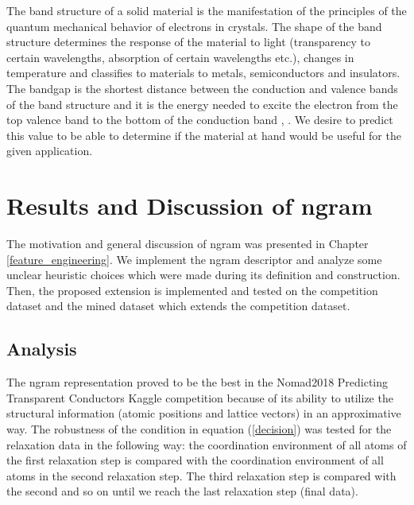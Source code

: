 \documentclass[11pt,oneside,czech,american]{book} %
\theoremstyle{plain}
\theoremstyle{definition}
\begin{document}
The band structure of a solid material is the manifestation of the principles of the quantum mechanical behavior of electrons in crystals. The shape of the band structure determines the response of the material to light (transparency to certain wavelengths, absorption of certain wavelengths etc.), changes in temperature and classifies to materials to metals, semiconductors and insulators. The bandgap is the shortest distance between the conduction and valence bands of the band structure and it is the energy needed to excite the electron from the top valence band to the bottom of the conduction band \parencite{sutton19}, \parencite{kraus16}. We desire to predict this value to be able to determine if the material at hand would be useful for the given application.

\section{Results and Discussion of ngram}
The motivation and general discussion of ngram was presented in Chapter \ref{feature_engineering}. We implement the ngram descriptor and analyze some unclear heuristic choices which were made during its definition and construction. Then, the proposed extension is implemented and tested on the competition dataset and the mined dataset which extends the competition dataset.
\subsection{Analysis}
The ngram representation proved to be the best in the Nomad2018 Predicting Transparent Conductors Kaggle competition because of its ability to utilize the structural information (atomic positions and lattice vectors) in an approximative way. The robustness of the condition in equation (\ref{decision}) was tested for the relaxation data in the following way: the coordination environment of all atoms of the first relaxation step is compared with the coordination environment of all atoms in the second relaxation step. The third relaxation step is compared with the second and so on until we reach the last relaxation step (final data).
\end{document}
